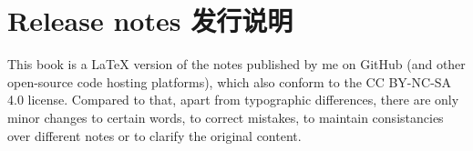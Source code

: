 \chapter{Release notes 发行说明}

This book is a \LaTeX{} version of the notes published by me on GitHub (and other open-source code hosting platforms), which also conform to the CC BY-NC-SA 4.0 license. Compared to that, apart from typographic differences, there are only minor changes to certain words, to correct mistakes, to maintain consistancies over different notes or to clarify the original content. 
